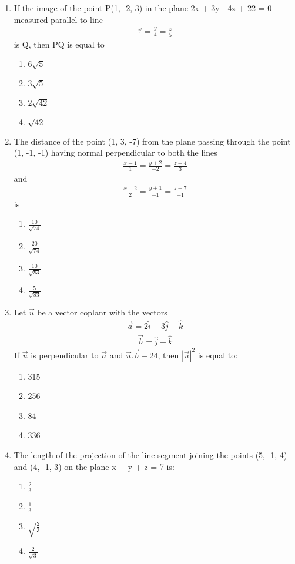 \begin{enumerate}[label=\arabic*.,ref=\thesubsection.\theenumi]
\item If the image of the point P(1, -2, 3) in the plane 2x + 3y - 4z + 22 = 0 measured parallel to line 
\begin{align*}
\frac{x}{1} = \frac{y}{4} = \frac{z}{5}
\end{align*}
is Q, then PQ is equal to
\begin{enumerate}
\item $6\sqrt{5}$
\item $3\sqrt{5}$
\item $2\sqrt{42}$
\item $\sqrt{42}$
\end{enumerate}

\item The distance of the point (1, 3, -7) from the plane passing through the point (1, -1, -1) having normal perpendicular to both the lines
\begin{align*}
\frac{x-1}{1} = \frac{y+2}{-2} = \frac{z-4}{3}
\end{align*}
and
\begin{align*}
\frac{x-2}{2} = \frac{y+1}{-1} = \frac{z+7}{-1}
\end{align*}
is
\begin{enumerate}
\item $\frac{10}{\sqrt{74}}$
\item $\frac{20}{\sqrt{74}}$
\item $\frac{10}{\sqrt{83}}$
\item $\frac{5}{\sqrt{83}}$
\end{enumerate}

\item Let $\overrightarrow{u}$ be a vector coplanr with the vectors 
\begin{align*}
\overrightarrow{a} = 2\hat{i} + 3\hat{j} - \hat{k}
\end{align*}
\begin{align*} 
\overrightarrow{b} = \hat{j} + \hat{k}
\end{align*}
If $\overrightarrow{u}$ is perpendicular to $\overrightarrow{a}$ and 
$\overrightarrow{u}.\overrightarrow{b} - 24$, then $|\overrightarrow{u}|^2$ is equal to:
\begin{enumerate}
\item 315
\item 256
\item 84
\item 336
\end{enumerate} 

\item The length of the projection of the line segment joining the points (5, -1, 4) and (4, -1, 3) on the plane x + y + z = 7 is:
\begin{enumerate}
\item $\frac{2}{3}$
\item $\frac{1}{3}$
\item $\sqrt{\frac{2}{3}}$
\item $\frac{2}{\sqrt{3}}$
\end{enumerate}


\end{enumerate}
